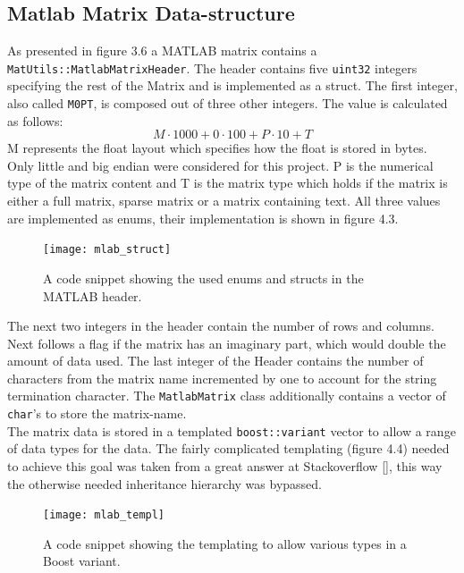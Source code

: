 \subsection{Matlab Matrix Data-structure}
As presented in figure 3.6 a MATLAB matrix contains a \texttt{MatUtils::MatlabMatrixHeader}. The header contains five \texttt{uint32} integers specifying the rest of the Matrix and is implemented as a struct. The first integer, also called \texttt{M0PT}, is composed out of three other integers. The value is calculated as follows:
$$M\cdot1000 + 0 \cdot 100 + P\cdot 10 + T$$
M represents the float layout which specifies how the float is stored in bytes. Only little and big endian were considered for this project. P is the numerical type of the matrix content and T is the matrix type which holds if the matrix is either a full matrix, sparse matrix or a matrix containing text. All three values are implemented as enums, their implementation is shown in figure 4.3.
\begin{figure}[h]
\centering
      \texttt{[image: mlab\_struct]}
        \caption{A code snippet showing the used enums and structs in the MATLAB header.}
\end{figure}
The next two integers in the header contain the number of rows and columns. Next follows a flag if the matrix has an imaginary part, which would double the amount of data used. The last integer of the Header contains the number of characters from the matrix name incremented by one to account for the string termination character.
The \texttt{MatlabMatrix} class additionally contains a vector of \texttt{char}'s to store the matrix-name.\\
The matrix data is stored in a templated \texttt{boost::variant} vector to allow a range of data types for the data. The fairly complicated templating (figure 4.4) needed to achieve this goal was taken from  a great answer at Stackoverflow [], this way the otherwise needed inheritance hierarchy was bypassed. 
\begin{figure}[h]
\centering
      \texttt{[image: mlab\_templ]}
        \caption{A code snippet showing the templating to allow various types in a Boost variant.}
\end{figure}
